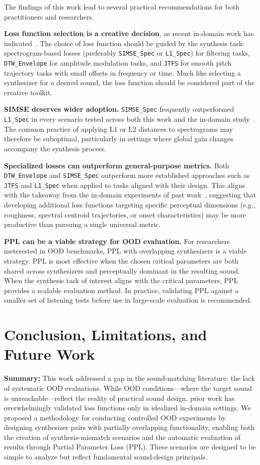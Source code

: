 \documentclass[10pt]{article} %
\newcommand{\SIMSESpec}{\texttt{SIMSE\_\allowbreak Spec}\xspace}
\newcommand{\LoneSpec}{\texttt{L1\_\allowbreak Spec}\xspace}
\newcommand{\JTFS}{\texttt{JTFS}\xspace}
\newcommand{\DTWEnv}{\texttt{DTW\_\allowbreak Envelope}\xspace}
\begin{document}
The findings of this work lead to several practical recommendations for both practitioners and researchers.

\textbf{Loss function selection is a creative decision}, as recent in-domain work has indicated~\cite{salimi2025evaluating}. The choice of loss function should be guided by the synthesis task: spectrogram-based losses (preferably \SIMSESpec{} or \LoneSpec{}) for filtering tasks, \DTWEnv{} for amplitude modulation tasks, and \JTFS{} for smooth pitch trajectory tasks with small offsets in frequency or time. Much like selecting a synthesizer for a desired sound, the loss function should be considered part of the creative toolkit.

\textbf{SIMSE deserves wider adoption.} \SIMSESpec{} frequently outperformed \LoneSpec{} in every scenario tested across both this work and the in-domain study~\cite{salimi2025evaluating}. The common practice of applying L1 or L2 distances to spectrograms may therefore be suboptimal, particularly in settings where global gain changes accompany the synthesis process.

\textbf{Specialized losses can outperform general-purpose metrics.} Both \DTWEnv{} and \SIMSESpec{} outperform more established approaches such as \JTFS{} and \LoneSpec{} when applied to tasks aligned with their design. This aligns with the takeaway from the in-domain experiments of past work~\cite{salimi2025evaluating}, suggesting that developing additional loss functions targeting specific perceptual dimensions (e.g., roughness, spectral centroid trajectories, or onset characteristics) may be more productive than pursuing a single universal metric. 

\textbf{PPL can be a viable strategy for OOD evaluation.} For researchers ineterested in OOD benchmarks, PPL with overlapping synthesizers is a viable strategy. PPL is most effective when the chosen critical parameters are both shared across synthesizers and perceptually dominant in the resulting sound. When the synthesis task of interest aligns with the critical parameters, PPL provides a scalable evaluation method. In practice, validating PPL against a smaller set of listening tests before use in large-scale evaluation is recommended.


\section{Conclusion, Limitations, and Future Work}

\textbf{Summary:} This work addressed a gap in the sound-matching literature: the lack of systematic OOD evaluations. While OOD conditions---where the target sound is unreachable---reflect the reality of practical sound design, prior work has overwhelmingly validated loss functions only in idealized in-domain settings. We proposed a methodology for conducting controlled OOD experiments by designing synthesizer pairs with partially overlapping functionality, enabling both the creation of synthesis-mismatch scenarios and the automatic evaluation of results through Partial Parameter Loss (PPL). These scenarios are designed to be simple to analyze but reflect fundamental sound-design principals.
\end{document}
